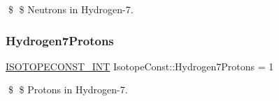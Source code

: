 \$ \$ Neutrons in Hydrogen-\/7. \mbox{\label{group___isotope_const-_hydrogen-_h7_ga52d491eb2166236933273ab7e0287252}} 
\subsubsection{\texorpdfstring{Hydrogen7\+Protons}{Hydrogen7Protons}}
{\footnotesize\ttfamily \mbox{\hyperlink{group___isotope_const-_macros_ga5f18360b3e99483a35c32d789e62621c}{I\+S\+O\+T\+O\+P\+E\+C\+O\+N\+S\+T\+\_\+\+I\+NT}} Isotope\+Const\+::\+Hydrogen7\+Protons = 1}

\$ \$ Protons in Hydrogen-\/7. 